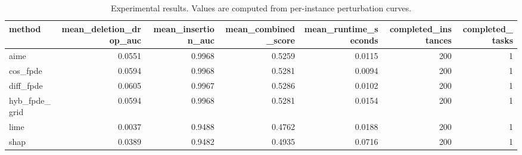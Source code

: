 \begin{table}[t]
\caption{Experimental results. Values are computed from per-instance perturbation curves.}
\label{tab:main_results_computed}
\centering
\begin{tabular}{lrrrrrr}
\toprule
method & mean\_deletion\_drop\_auc & mean\_insertion\_auc & mean\_combined\_score & mean\_runtime\_seconds & completed\_instances & completed\_tasks \\
\midrule
aime & 0.0551 & 0.9968 & 0.5259 & 0.0115 & 200 & 1 \\
cos\_fpde & 0.0594 & 0.9968 & 0.5281 & 0.0094 & 200 & 1 \\
diff\_fpde & 0.0605 & 0.9967 & 0.5286 & 0.0102 & 200 & 1 \\
hyb\_fpde\_grid & 0.0594 & 0.9968 & 0.5281 & 0.0154 & 200 & 1 \\
lime & 0.0037 & 0.9488 & 0.4762 & 0.0188 & 200 & 1 \\
shap & 0.0389 & 0.9482 & 0.4935 & 0.0716 & 200 & 1 \\
\bottomrule
\end{tabular}

\end{table}
